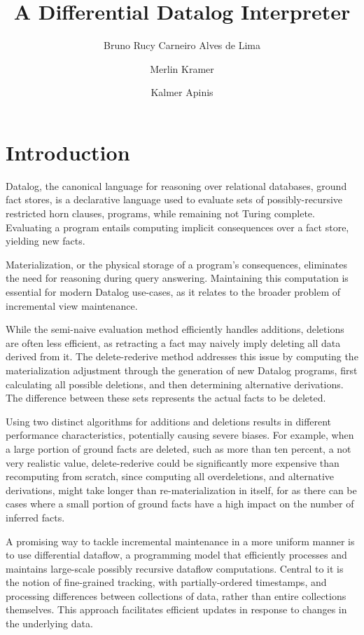 \documentclass[sigconf,screen,review=false,natbib]{acmart}
\title{A Differential Datalog Interpreter}
\author{Bruno Rucy Carneiro Alves de Lima}
\affiliation{%
	\institution{University of Tartu}
	\department{Institute of Computer Science}
	\city{Tartu}
	\country{Estonia}
}
\author{Merlin Kramer}
\affiliation{%
	\institution{unaffiliated}
	\city{Wuppertal}
	\country{Germany}
}
\author{Kalmer Apinis}
\affiliation{%
	\institution{University of Tartu}
	\department{Institute of Computer Science}
	\city{Tartu}
	\country{Estonia}
}
\theoremstyle{definition}
\begin{document}
\maketitle

\section{Introduction}
Datalog\cite{datalog}, the canonical language for reasoning over relational databases, ground fact stores, is a
declarative language used to evaluate sets of possibly-recursive restricted horn clauses, programs, while
remaining not Turing complete. Evaluating a program entails computing implicit consequences over a fact
store, yielding new facts.

Materialization, or the physical storage of a program's consequences, eliminates the need for reasoning
during query answering. Maintaining this computation is essential for modern Datalog use-cases, as it
relates to the broader problem of incremental view maintenance.

While the semi-naive evaluation method\cite{datalog} efficiently handles additions, deletions are often less efficient, as
retracting a fact may naively imply deleting all data derived from it. The delete-rederive\cite{dred} method addresses
this issue by computing the materialization adjustment through the generation of new Datalog programs, first
calculating all possible deletions, and then determining alternative derivations. The difference between these
sets represents the actual facts to be deleted.

Using two distinct algorithms for additions and deletions results in different performance characteristics,
potentially causing severe biases. For example, when a large portion of ground facts are deleted, such as more than
ten percent, a not very realistic value, delete-rederive could be significantly more expensive than recomputing from
scratch, since computing all overdeletions, and alternative derivations, might take longer than re-materialization in itself,
for as there can be cases where a small portion of ground facts have a high impact on the number of inferred facts.

A promising way to tackle incremental maintenance in a more uniform manner is to use differential dataflow, a
programming model that efficiently processes and maintains large-scale possibly recursive dataflow computations. Central
to it is the notion of fine-grained tracking, with partially-ordered timestamps, and processing differences between
collections of data, rather than entire collections themselves. This approach facilitates efficient updates in response
to changes in the underlying data\cite{differential_dataflow}.
\end{document}
